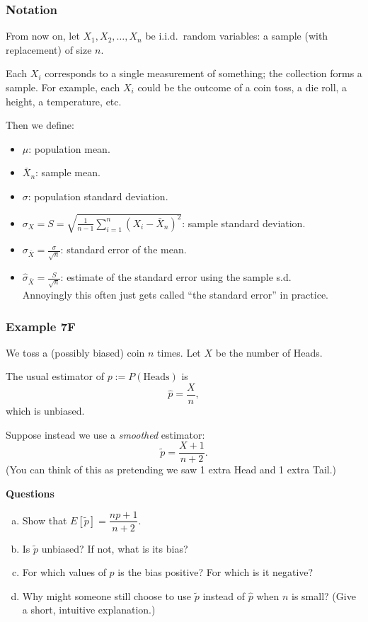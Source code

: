 \documentclass[t,8pt]{beamer}
\begin{document}
\begin{frame}
	\frametitle{Notation}
	From now on, let $X_1,X_2,\dots,X_n$ be i.i.d.\ random variables: a sample (with replacement) of size $n$. \par
	{\small\color{NavyBlue}
		Each $X_i$ corresponds to a single measurement of something; the collection forms a sample.
		For example, each $X_i$ could be the outcome of a coin toss, a die roll, a height, a temperature, etc.
	} \par
	Then we define:
	\begin{itemize}
		\item $\mu$: population mean.
		\item $\bar X_n$: sample mean.
		\item $\sigma$: population standard deviation.
		\item $\sigma_X=S=\sqrt{\frac{1}{n-1}\sum_{i=1}^n(X_i-\bar X_n)^2}$: sample standard deviation.
		\item $\sigma_{\bar X}=\frac{\sigma}{\sqrt n}$: standard error of the mean.
		\item $\hat\sigma_{\bar X}=\frac{S}{\sqrt n}$: estimate of the standard error using the sample s.d.\\
		{\small\color{NavyBlue}
			Annoyingly this often just gets called ``the standard error'' in practice.
		}
	\end{itemize}
\end{frame}

\begin{frame}
	\frametitle{Example 7F}
	
	We toss a (possibly biased) coin $n$ times. Let $X$ be the number of Heads. \par
	The usual estimator of $p := P(\text{Heads})$ is
	\[
	\hat p = \frac{X}{n},
	\]
	which is unbiased. \par\medskip
	
	Suppose instead we use a \emph{smoothed} estimator:
	\[
	\tilde p = \frac{X+1}{n+2}.
	\]
	(You can think of this as pretending we saw 1 extra Head and 1 extra Tail.) \par\medskip
	
	\textbf{Questions}
	\begin{enumerate}[(a)]
		\item Show that $E[\tilde p] = \dfrac{np+1}{n+2}$.
		\item Is $\tilde p$ unbiased? If not, what is its bias?
		\item For which values of $p$ is the bias positive? For which is it negative?
		\item Why might someone still choose to use $\tilde p$ instead of $\hat p$ when $n$ is small?
		(Give a short, intuitive explanation.)
	\end{enumerate}
\end{frame}
\end{document}
